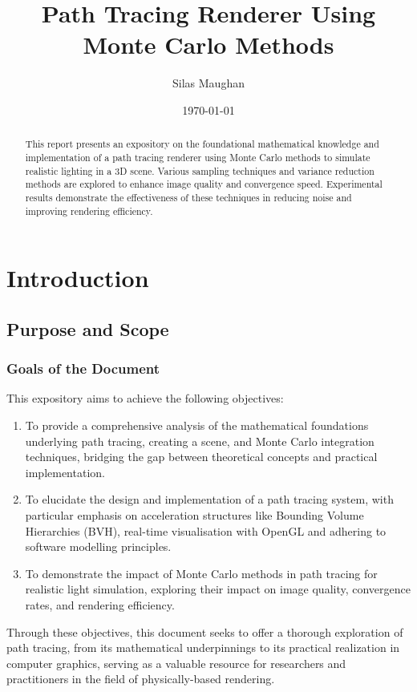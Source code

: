 \documentclass[12pt]{article}
\title{Path Tracing Renderer Using Monte Carlo Methods}
\author{Silas Maughan}
\date{\today}
\begin{document}
\maketitle

\begin{abstract}
    This report presents an expository on the foundational mathematical knowledge and implementation of a path tracing renderer using Monte Carlo methods to simulate realistic lighting in a 3D scene. Various sampling techniques and variance reduction methods are explored to enhance image quality and convergence speed. Experimental results demonstrate the effectiveness of these techniques in reducing noise and improving rendering efficiency.
\end{abstract}

\tableofcontents

\section{Introduction}
\label{sec:intro}
\subsection{Purpose and Scope}
\subsubsection{Goals of the Document}

This expository aims to achieve the following objectives:
\begin{enumerate}
    \item To provide a comprehensive analysis of the mathematical foundations underlying path tracing, creating a scene, and Monte Carlo integration techniques, bridging the gap between theoretical concepts and practical implementation.

    \item To elucidate the design and implementation of a path tracing system, with particular emphasis on acceleration structures like Bounding Volume Hierarchies (BVH), real-time visualisation with OpenGL and adhering to software modelling principles.

    \item To demonstrate the impact of Monte Carlo methods in path tracing for realistic light simulation, exploring their impact on image quality, convergence rates, and rendering efficiency.
\end{enumerate}
Through these objectives, this document seeks to offer a thorough exploration of path tracing, from its mathematical underpinnings to its practical realization in computer graphics, serving as a valuable resource for researchers and practitioners in the field of physically-based rendering.
\end{document}

